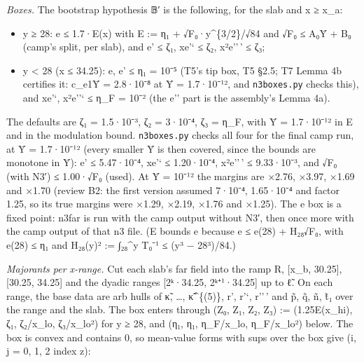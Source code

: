 \documentclass[
]{article}
\providecommand{\tightlist}{%
  \setlength{\itemsep}{0pt}\setlength{\parskip}{0pt}}
\begin{document}
\emph{Boxes.} The bootstrap hypothesis 𝔹′ is the following, for the slab
and x ≥ x\_a:

\begin{itemize}
\tightlist
\item
  y ≥ 28: \textbar e\textbar{} ≤ 1.7·E(x) with E := η₁ +
  √F₀·y\^{}\{3/2\}/√84 and √F₀ ≤ A₀Ȳ + B₀ (camp's split, per slab), and
  \textbar e'\textbar{} ≤ ζ₁, x\textbar e'`\textbar{} ≤ ζ₂,
  x²\textbar e''\,'\textbar{} ≤ ζ₃;
\item
  y \textless{} 28 (x ≤ 34.25): \textbar e\textbar,
  \textbar e'\textbar{} ≤ η₁ = 10⁻⁵ (T5's tip box, T5 §2.5; T7 Lemma 4b
  certifies it: c\_e1Ȳ = 2.8·10⁻⁸ at Ȳ = 1.7·10⁻¹², and
  \texttt{n3boxes.py} checks this), and x\textbar e'`\textbar,
  x²\textbar e''`\textbar{} ≤ η\_F = 10⁻² (the e'' part is the
  assembly's Lemma 4a).
\end{itemize}

The defaults are ζ₁ = 1.5·10⁻³, ζ₂ = 3·10⁻⁴, ζ₃ = η\_F, with Ȳ =
1.7·10⁻¹² in E and in the modulation bound. \texttt{n3boxes.py} checks
all four for the final camp run, at Ȳ = 1.7·10⁻¹² (every smaller Ȳ is
then covered, since the bounds are monotone in Ȳ): \textbar e'\textbar{}
≤ 5.47·10⁻⁴, x\textbar e'`\textbar{} ≤ 1.20·10⁻⁴,
x²\textbar e''\,'\textbar{} ≤ 9.33·10⁻³, and √F₀ (with N3′) ≤ 1.00·√F₀
(used). At Ȳ = 10⁻¹² the margins are ×2.76, ×3.97, ×1.69 and ×1.70
(review B2: the first version assumed 7·10⁻⁴, 1.65·10⁻⁴ and factor 1.25,
so its true margins were ×1.29, ×2.19, ×1.76 and ×1.25). The
\textbar e\textbar{} box is a fixed point: n3far is run with the camp
output without N3′, then once more with the camp output of that n3 file.
(E bounds \textbar e\textbar{} because \textbar e\textbar{} ≤
\textbar e(28)\textbar{} + H₂₈√F₀, with \textbar e(28)\textbar{} ≤ η₁
and H₂₈(y)² := ∫₂₈\^{}y T₀⁻¹ ≤ (y³ − 28³)/84.)

\emph{Majorants per x-range.} Cut each slab's far field into the ramp R,
{[}x\_b, 30.25{]}, {[}30.25, 34.25{]} and the dyadic ranges {[}2ᵏ·34.25,
2ᵏ⁺¹·34.25{]} up to ℓ̃. On each range, the base data are arb hulls of κ̃,
\ldots, κ̃\^{}\{(5)\}, r', r'`, r''\,' and p̃, q̃, ñ, t̃₁ over the range and
the slab. The box enters through (Z₀, Z₁, Z₂, Z₃) := (1.25E(x\_hi), ζ₁,
ζ₂/x\_lo, ζ₃/x\_lo²) for y ≥ 28, and (η₁, η₁, η\_F/x\_lo, η\_F/x\_lo²)
below. The box is convex and contains 0, so mean-value forms with sups
over the box give (i, j = 0, 1, 2 index z):
\end{document}
